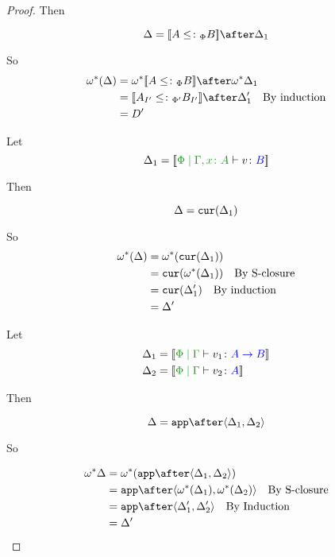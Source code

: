 \documentclass{report}
\begin{document}
\begin{framed}
\begin{proof}
        Then
        
        \begin{equation}
            \D = \deno{A\subtypep B}\after \D_1\\
        \end{equation}
        
        So 
        \begin{align*}
            \w\star(\D) & = \w\star{\deno{A\subtypep B}}\after\w\star\D_1 \\
            & = \deno{A_{I'}\subtypepp B_{I'}}\after\D_1'\qt{By induction}\\
            & = D'
        \end{align*}
        
        Let \begin{equation}
            \D_1 = \deno{\etyperelation{\P}{\gax}{v}{B}}
        \end{equation}
        
        Then
        
        \begin{equation}
            \Delta = \texttt{cur}(\Delta_1)\\
        \end{equation}
        
        So
        \begin{align*}
            \omega^*(\Delta) & = \omega^*(\texttt{cur}(\Delta_1))\\
            & = \texttt{cur}(\omega^*(\Delta_1))\quad\text{By S-closure}\\
            & = \texttt{cur}(\Delta_1')\quad\text{By induction}\\
            & = \Delta'
        \end{align*}
        
        Let \begin{align*}
            \D_1 &= \deno{\gpetyperelation{v_1}{\ab}}\\
            \D_2 &= \deno{\gpetyperelation{v_2}{A}}
        \end{align*}
        
        Then
        
        \begin{equation}
            \D = \app\after\pr{\D_1}{\D_2}\\
        \end{equation}
        
        So
        
        \begin{align*}
            \w\star\D & = \w\star(\app\after\pr{\D_1}{\D_2})\\
            & = \app\after\pr{\w\star(\D_1)}{\w\star(\D_2)}\qt{By S-closure}\\
            & = \app\after\pr{\D_1'}{\D_2'}\qt{By Induction}\\
            & = \D'
        \end{align*}
        

\end{proof}
\end{framed}
\end{document}
